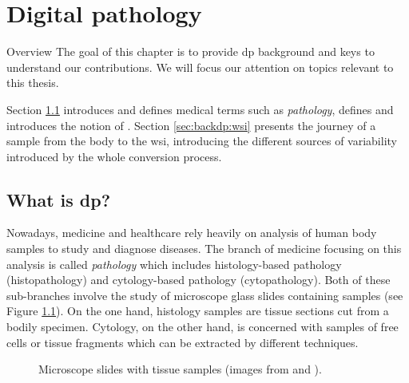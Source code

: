 \chapter{Digital pathology}
\label{chap:backdp}

\begin{overview}{Overview}
  The goal of this chapter is to provide \acrlong{dp} background and keys to understand our contributions. We will focus our attention on topics relevant to this thesis. 
  
  Section \ref{sec:backdp:whatisdp} introduces and defines medical terms such as \textit{pathology}, defines  and introduces the notion of . Section \ref{sec:backdp:wsi} presents the journey of a sample from the body to the \acrshort{wsi}, introducing the different sources of variability introduced by the whole conversion process. 
\end{overview}


\section{What is \acrlong{dp}?}
\label{sec:backdp:whatisdp}

Nowadays, medicine and healthcare rely heavily on analysis of human body samples to study and diagnose diseases. The branch of medicine focusing on this analysis is called \textit{pathology} which includes histology-based pathology (\aka histopathology) and cytology-based pathology (\aka cytopathology). Both of these sub-branches involve the study of microscope glass slides containing samples (see Figure \ref{fig:backdp:glassslides}). On the one hand, histology samples are tissue sections cut from a bodily specimen. Cytology, on the other hand, is concerned with samples of free cells or tissue fragments which can be extracted by different techniques. 

\begin{figure}
  \centering
  \quad
  \caption{Microscope slides with tissue samples (images from \parencite{img:glassslides} and ).}
  \label{fig:backdp:glassslides}
\end{figure}

